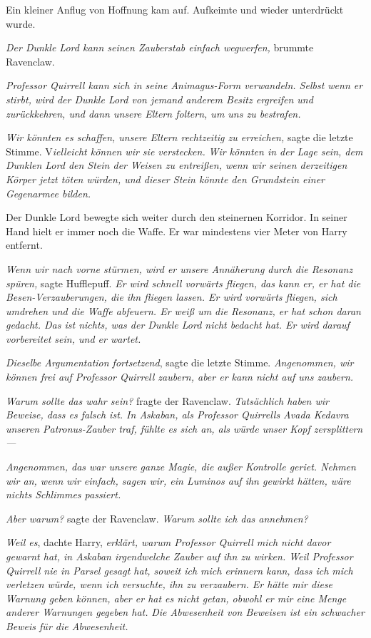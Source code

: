 {Ein kleiner Anflug von Hoffnung kam auf. Aufkeimte und wieder unterdrückt wurde.

\emph{Der Dunkle Lord kann seinen Zauberstab einfach wegwerfen,} brummte Ravenclaw.

\emph{Professor Quirrell kann sich in seine Animagus-Form verwandeln. Selbst wenn er stirbt, wird der Dunkle Lord von jemand anderem Besitz ergreifen und zurückkehren, und dann unsere Eltern foltern, um uns zu bestrafen.}

\emph{\hfill\break Wir könnten es schaffen, unsere Eltern rechtzeitig zu erreichen,} sagte die letzte Stimme. V\emph{ielleicht können wir sie verstecken.} \emph{Wir könnten in der Lage sein, dem Dunklen Lord den Stein der Weisen zu entreißen, wenn wir seinen derzeitigen Körper jetzt töten würden, und dieser Stein könnte den Grundstein einer Gegenarmee bilden.}

Der Dunkle Lord bewegte sich weiter durch den steinernen Korridor. In seiner Hand hielt er immer noch die Waffe. Er war mindestens vier Meter von Harry entfernt.

\emph{Wenn wir nach vorne stürmen, wird er unsere Annäherung durch die Resonanz spüren,} sagte Hufflepuff. \emph{Er wird schnell vorwärts fliegen, das kann er, er hat die Besen-Verzauberungen, die ihn fliegen lassen. Er wird vorwärts fliegen, sich umdrehen und die Waffe abfeuern. Er weiß um die Resonanz, er hat schon daran gedacht. Das ist nichts, was der Dunkle Lord nicht bedacht hat. Er wird darauf vorbereitet sein, und er wartet.}

\emph{Dieselbe Argumentation fortsetzend}, sagte die letzte Stimme. \emph{Angenommen, wir können frei auf Professor Quirrell zaubern, aber er kann nicht auf uns zaubern.}

\emph{\hfill\break Warum sollte das wahr sein?} fragte der Ravenclaw. \emph{Tatsächlich haben wir Beweise, dass es falsch ist. In Askaban, als Professor Quirrells Avada Kedavra unseren Patronus-Zauber traf, fühlte es sich an, als würde unser Kopf zersplittern—}

\emph{Angenommen, das war unsere ganze Magie, die außer Kontrolle geriet. Nehmen wir an, wenn wir einfach, sagen wir, ein Luminos auf ihn gewirkt hätten, wäre nichts Schlimmes passiert.}

\emph{Aber warum?} sagte der Ravenclaw. \emph{Warum sollte ich das annehmen?}

\emph{Weil es}, dachte Harry, \emph{erklärt, warum Professor Quirrell mich nicht davor gewarnt hat, in Askaban irgendwelche Zauber auf ihn zu wirken. Weil Professor Quirrell nie in Parsel gesagt hat, soweit ich mich erinnern kann, dass ich mich verletzen würde, wenn ich versuchte, ihn zu verzaubern. Er hätte mir diese Warnung geben können, aber er hat es nicht getan, obwohl er mir eine Menge anderer Warnungen gegeben hat.} \emph{Die Abwesenheit von Beweisen ist ein schwacher Beweis für die Abwesenheit.}

}
